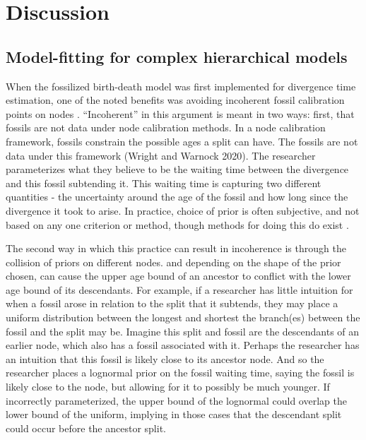 \documentclass{article}
\begin{document}
\section{Discussion}

\subsection{Model-fitting for complex hierarchical models}

When the fossilized birth-death model was first implemented for divergence time estimation, one of the noted benefits was avoiding incoherent fossil calibration points on nodes \citep{Heath2014}.
``Incoherent'' in this argument is meant in two ways: first, that fossils are not data under node calibration methods.
In a node calibration framework, fossils constrain the possible ages a split can have.
The fossils are not data under this framework (Wright and Warnock 2020). 
The researcher parameterizes what they believe to be the waiting time between the divergence and this fossil subtending it. 
This waiting time is capturing two different quantities - the uncertainty around the age of the fossil and how long since the divergence it took to arise.
In practice, choice of prior is often subjective, and not based on any one criterion or method, though methods for doing this do exist \citep{Nowak2013}.

The second way in which this practice can result in incoherence is through the collision of priors on different nodes.
and depending on the shape of the prior chosen, can cause the upper age bound of an ancestor to conflict with the lower age bound of its descendants. 
For example, if a researcher has little intuition for when a fossil arose in relation to the split that it subtends, they may place a uniform distribution between the longest and shortest the branch(es) between the fossil and the split may be.
Imagine this split and fossil are the descendants of an earlier node, which also has a fossil associated with it. 
Perhaps the researcher has an intuition that this fossil is likely close to its ancestor node. 
And so the researcher places a lognormal prior on the fossil waiting time, saying the fossil is likely close to the node, but allowing for it to possibly be much younger. 
If incorrectly parameterized, the upper bound of the lognormal could overlap the lower bound of the uniform, implying in those cases that the descendant split could occur before the ancestor split.
\end{document}
